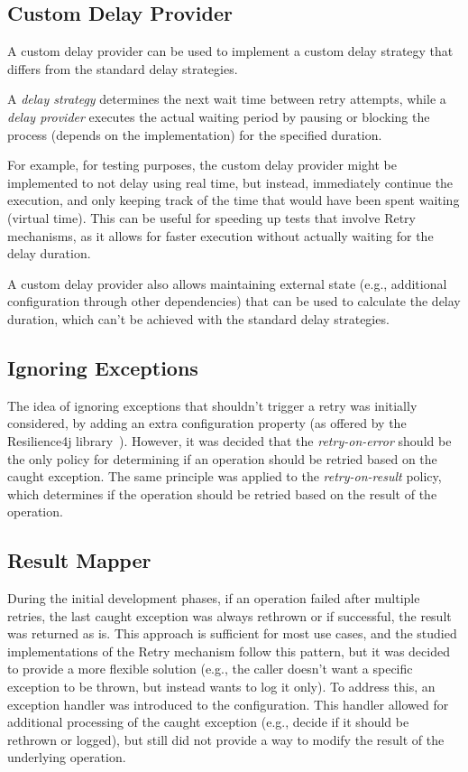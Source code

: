 \subsection{Custom Delay Provider}\label{subsec:retry-custom-delay-provider}

A custom delay provider can be used
to implement a custom delay strategy that differs from the standard delay strategies.

A \textit{delay strategy} determines the next wait time between retry attempts,
while a \textit{delay provider} executes the actual waiting period by pausing or blocking the process
(depends on the implementation) for the specified duration.

For example, for testing purposes, the custom delay provider might be implemented to not delay using real time,
but instead, immediately continue the execution,
and only keeping track of the time that would have been spent waiting (virtual time).
This can be useful for speeding up tests that involve Retry mechanisms,
as it allows for faster execution without actually waiting for the delay duration.

A custom delay provider also allows maintaining external state
(e.g., additional configuration through other dependencies) that can be used to calculate the delay duration,
which can't be achieved with the standard delay strategies.

\subsection{Ignoring Exceptions}\label{subsec:retry-ignoring-exceptions}

The idea of ignoring exceptions that shouldn’t trigger a retry was initially considered,
by adding an extra configuration property (as offered by the Resilience4j library~\cite{resilience4j-retry}).
However,
it was decided
that the \textit{retry-on-error} should be the only policy
for determining if an operation should be retried based on the caught exception.
The same principle was applied to the \textit{retry-on-result} policy, which determines if the operation should be retried based on the result of the operation.

\subsection{Result Mapper}\label{subsec:retry-result-mapper}

During the initial development phases, if an operation failed after multiple retries,
the last caught exception was always rethrown or if successful, the result was returned as is.
This approach is sufficient for most use cases,
and the studied implementations of the Retry mechanism follow this pattern, but
it was decided to provide a more flexible solution
(e.g., the caller doesn't want a specific exception to be thrown, but instead wants to log it only).
To address this, an exception handler was introduced to the configuration.
This handler allowed for additional processing of the caught exception
(e.g., decide if it should be rethrown or logged),
but still did not provide a way to modify the result of the underlying operation.

